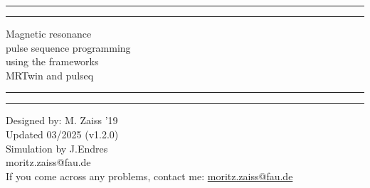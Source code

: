 \documentclass[a4paper,12pt]{extarticle}
\begin{document}

\graphicspath{ {./img/} }
\begin{titlepage}
	\centering %
	\scshape %
	\vspace*{1.5\baselineskip} %

	\rule{13cm}{1.6pt}\vspace*{-\baselineskip}\vspace*{2pt} %
	\rule{13cm}{0.4pt} %
	
		\vspace{0.75\baselineskip} %
		{\Huge Magnetic resonance  \\ 
			\vspace{4mm}
            pulse sequence programming \\
            \vspace{4mm}
	         using the frameworks \\ MRTwin and pulseq \\	
        }
		\vspace{0.75\baselineskip} %
	\rule{13cm}{0.4pt}\vspace*{-\baselineskip}\vspace{3.2pt} %
	\rule{13cm}{1.6pt} %
	
		\vspace{1.75\baselineskip} %
	{\large Designed by: M. Zaiss '19 \\
	Updated 03/2025 (v1.2.0) \\
 \vspace*{1.2\baselineskip}
 Simulation by J.Endres\\
		\vspace*{1.2\baselineskip}
	moritz.zaiss@fau.de} \\
	\vfill
If you come across any problems, contact me: \url{moritz.zaiss@fau.de}\\ \vspace{1mm}
\end{titlepage}
\tableofcontents
\vfill
\end{document}
